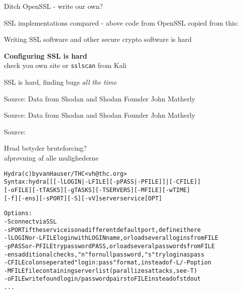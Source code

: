 \documentclass[Screen16to9,17pt]{foils}
\begin{document}
\begin{list2}
\item Ditch OpenSSL - write our own?
\item SSL implementations compared - above code from OpenSSL copied from this:\\

\item Writing SSL software and other secure crypto software is hard
\item {\bf Configuring SSL is hard}\\
check you own site  or \verb+sslscan+ from Kali
\item SSL is hard, finding bugs \emph{all the time}
\end{list2}



Source: Data from Shodan and Shodan Founder John Matherly




Source: Data from Shodan and Shodan Founder John Matherly




Source:




\begin{list1}
\item Hvad betyder bruteforcing?\\
afprøvning af alle mulighederne
\end{list1}

\begin{alltt}\small
Hydra (c) by van Hauser / THC <vh@thc.org>
Syntax: hydra [[[-l LOGIN|-L FILE] [-p PASS|-P FILE]] | [-C FILE]]
[-o FILE] [-t TASKS] [-g TASKS] [-T SERVERS] [-M FILE] [-w TIME]
[-f] [-e ns] [-s PORT] [-S] [-vV] server service [OPT]

Options:
  -S        connect via SSL
  -s PORT   if the service is on a different default port, define it here
  -l LOGIN  or -L FILE login with LOGIN name, or load several logins from FILE
  -p PASS   or -P FILE try password PASS, or load several passwords from FILE
  -e ns     additional checks, "n" for null password, "s" try login as pass
  -C FILE   colon seperated "login:pass" format, instead of -L/-P option
  -M FILE   file containing server list (parallizes attacks, see -T)
  -o FILE   write found login/password pairs to FILE instead of stdout
...
\end{alltt}
\end{document}
